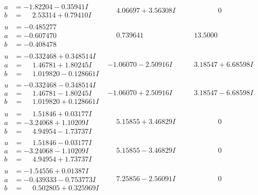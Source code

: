 \documentclass[1p]{elsarticle_modified}
\theoremstyle{definition}
\begin{document}
$$\begin{array}{c|c|c}
\begin{aligned}
a &= -1.82204 - 0.35941 I \\
b &= \phantom{-}2.53314 + 0.79410 I\end{aligned}
 & \phantom{-}4.06697 + 3.56308 I & \phantom{-0.000000 } 0 \\ \hline\begin{aligned}
u &= -0.485277\phantom{ +0.000000I} \\
a &= -0.607470\phantom{ +0.000000I} \\
b &= -0.408478\phantom{ +0.000000I}\end{aligned}
 & \phantom{-}0.739641\phantom{ +0.000000I} & \phantom{-}13.5000\phantom{ +0.000000I} \\ \hline\begin{aligned}
u &= -0.332468 + 0.348514 I \\
a &= \phantom{-}1.46781 + 1.80245 I \\
b &= \phantom{-}1.019820 - 0.128661 I\end{aligned}
 & -1.06070 - 2.50916 I & \phantom{-}3.18547 + 6.68598 I \\ \hline\begin{aligned}
u &= -0.332468 - 0.348514 I \\
a &= \phantom{-}1.46781 - 1.80245 I \\
b &= \phantom{-}1.019820 + 0.128661 I\end{aligned}
 & -1.06070 + 2.50916 I & \phantom{-}3.18547 - 6.68598 I \\ \hline\begin{aligned}
u &= \phantom{-}1.51846 + 0.03177 I \\
a &= -3.24068 + 1.10209 I \\
b &= \phantom{-}4.94954 - 1.73737 I\end{aligned}
 & \phantom{-}5.15855 + 3.46829 I & \phantom{-0.000000 } 0 \\ \hline\begin{aligned}
u &= \phantom{-}1.51846 - 0.03177 I \\
a &= -3.24068 - 1.10209 I \\
b &= \phantom{-}4.94954 + 1.73737 I\end{aligned}
 & \phantom{-}5.15855 - 3.46829 I & \phantom{-0.000000 } 0 \\ \hline\begin{aligned}
u &= -1.54556 + 0.01387 I \\
a &= -0.439333 - 0.753773 I \\
b &= \phantom{-}0.502805 + 0.325969 I\end{aligned}
 & \phantom{-}7.25856 - 2.56091 I & \phantom{-0.000000 } 0\\

\end{array}$$
\end{document}
